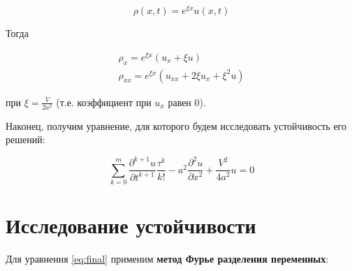 \begin{equation*}
\rho (x,t) = e^{\xi x} u(x,t)
\end{equation*}

Тогда

\begin{align*}
\rho_x = e^{\xi x} (u_x + \xi u)\\
\rho_{xx} = e^{\xi x} (u_{xx} + 2 \xi u_x + \xi^2 u)
\end{align*}


при $\xi = \frac{V}{2a^2}$ (т.е. коэффициент при $u_x$ равен $0$).

Наконец, получим уравнение, для которого будем исследовать устойчивость его решений:

\begin{equation}\label{eq:final}
\sum\limits_{k=0}^{m} \dfrac{\partial^{k+1} u}{\partial t^{k+1}} \dfrac{\tau^k}{k!} - a^2 \dfrac{\partial^2 u}{\partial x^2} + \dfrac{V^2}{4a^2} u = 0
\end{equation}

\section{Исследование устойчивости}

Для уравнения \ref{eq:final} применим \textbf{метод Фурье разделения переменных}: